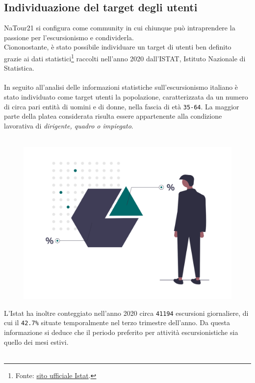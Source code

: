 \documentclass{natourDoc}
\begin{document}
\subsection{Individuazione del target degli utenti}
NaTour21 si configura come community in cui chiunque può intraprendere la passione per l'escursionismo e condividerla.\\
Ciononostante, è stato possibile individuare un target di utenti ben definito grazie ai dati
statistici\footnote{Fonte: \href{http://dati.istat.it/Index.aspx?DataSetCode=DCCV_ESC_CAPI}{sito ufficiale Istat}.} raccolti
nell'anno 2020 dall'ISTAT, Istituto Nazionale di Statistica.\\\\
In seguito all'analisi delle informazioni statistiche sull'escursionismo italiano è stato individuato come target utenti la popolazione, caratterizzata da un
numero di circa pari entità di uomini e di donne, nella fascia di età \texttt{35-64}. La maggior parte della
platea considerata risulta essere appartenente alla condizione lavorativa di \textit{dirigente, quadro o impiegato}.\\\\
\begin{figure}[!htbp]
	\centering
	\includegraphics[width=12cm, page=1]{./logos/undraw_statistic_chart_38b6.png}
\end{figure}
\FloatBarrier
L'Istat ha inoltre conteggiato nell'anno 2020 circa \texttt{41194} escursioni giornaliere,
di cui il \texttt{42.7\%} situate temporalmente nel terzo trimestre dell'anno. Da questa informazione si deduce che il periodo
preferito per attività escursionistiche sia quello dei mesi estivi.\\\\
\end{document}
